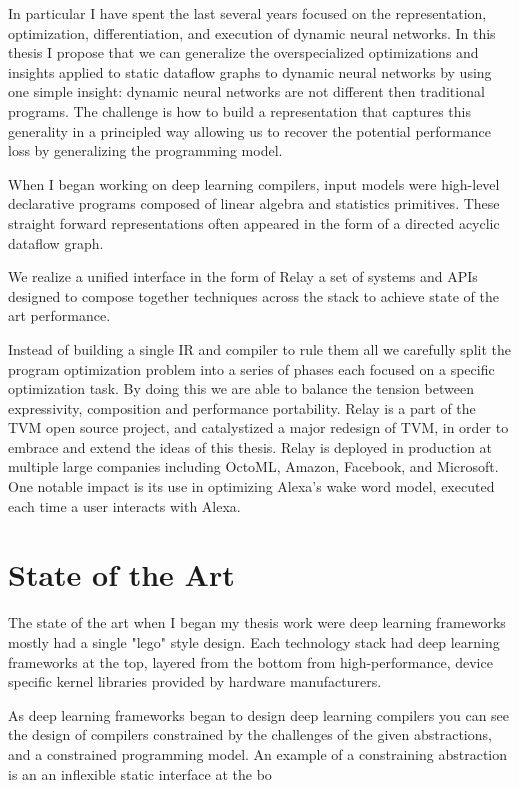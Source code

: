 In particular I have spent the last several years focused on the representation,
optimization, differentiation, and execution of dynamic neural networks.
In this thesis I propose that we can generalize the overspecialized optimizations
and insights applied to static dataflow graphs to dynamic neural networks by using
one simple insight: dynamic neural networks are not different then traditional
programs. The challenge is how to build a representation that captures this generality
in a principled way allowing us to recover the potential performance loss by generalizing
the programming model.

When I began working on deep learning compilers, input models were high-level
declarative programs composed of linear algebra and statistics primitives.
These straight forward representations often appeared in the form of
a directed acyclic dataflow graph.

We realize a unified interface in the form of Relay a set of systems and APIs designed
  to compose together techniques across the stack to achieve state of the art performance.

Instead of building a single IR and compiler to rule them all we carefully split
  the program optimization problem into a series of phases each focused on a specific
  optimization task.
By doing this we are able to balance the tension between expressivity, composition
  and performance portability.
Relay is a part of the TVM open source project, and catalystized a major redesign of
  TVM, in order to embrace and extend the ideas of this thesis.
Relay is deployed in production at multiple large companies including
  OctoML, Amazon, Facebook, and Microsoft.
One notable impact is its use in
  optimizing Alexa’s wake word model, executed each time a user interacts with
  Alexa.

\section{State of the Art}

The state of the art when I began my thesis work were deep learning frameworks mostly had
a single "lego" style design. Each technology stack had deep learning frameworks at the top, layered
from the bottom from high-performance, device specific kernel libraries provided by hardware manufacturers.

As deep learning frameworks began to design deep learning compilers you can see the design of compilers constrained
by the challenges of the given abstractions, and a constrained programming model. An example of a constraining
abstraction is an an inflexible static interface at the bo

